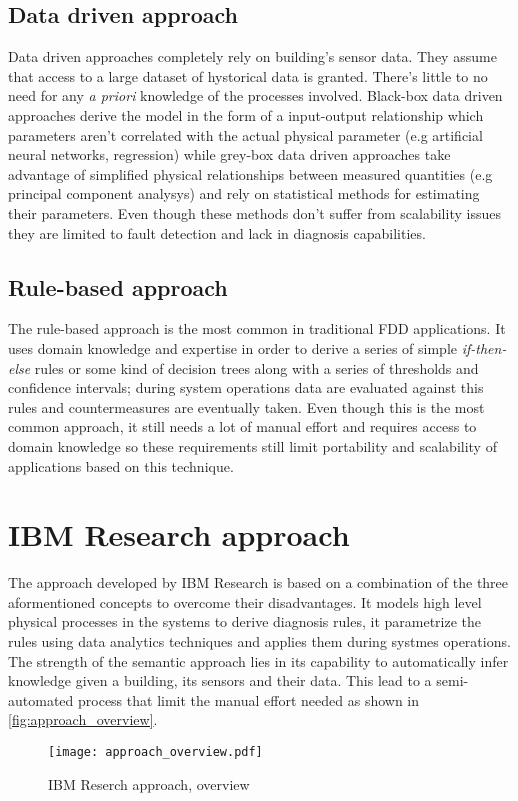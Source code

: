 \subsection{Data driven approach} \label{subsec:data_models}
Data driven approaches completely rely on building's sensor data. They assume that access to a large dataset of hystorical data is granted. There's little to no need for any \textit{a priori} knowledge of the processes involved. Black-box data driven approaches derive the model in the form of a input-output relationship which parameters aren't correlated with the actual physical parameter (e.g artificial neural networks, regression) while grey-box data driven approaches take advantage of simplified physical relationships between measured quantities (e.g principal component analysys) and rely on statistical methods for estimating their parameters. Even though these methods don't suffer from scalability issues they are limited to fault detection and lack in diagnosis capabilities.

\subsection{Rule-based approach} \label{subsec:rule_models}
The rule-based approach is the most common in traditional FDD applications. It uses domain knowledge and expertise in order to derive a series of simple \textit{if-then-else} rules or some kind of decision trees along with a series of thresholds and confidence intervals; during system operations data are evaluated against this rules and countermeasures are eventually taken. Even though this is the most common approach, it still needs a lot of manual effort and requires access to domain knowledge so these requirements still limit portability and scalability of applications based on this technique.

\section{IBM Research approach}
The approach developed by IBM Research is based on a combination of the three aformentioned concepts to overcome their disadvantages. It models high level physical processes in the systems to derive diagnosis rules, it parametrize the rules using data analytics techniques and applies them during systmes operations. The strength of the semantic approach lies in its capability to automatically infer knowledge given a building, its sensors and their data. This lead to a semi-automated process that limit the manual effort needed as shown in \autoref{fig:approach_overview}.
\begin{figure}
  \centering
  \texttt{[image: approach\_overview.pdf]}
  \caption{IBM Reserch approach, overview}
  \label{fig:approach_overview}
\end{figure}

